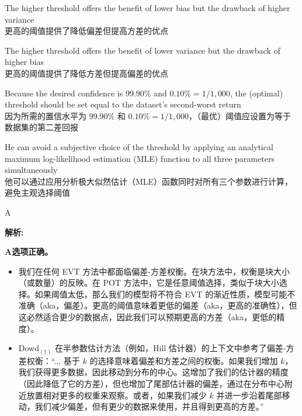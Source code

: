 \documentclass{article}
\newenvironment{explanation}
{\textbf{解析:}\par}
{\par}
\begin{document}
\begin{choices}
    \item The higher threshold offers the benefit of lower bias but the drawback of higher variance\\
    更高的阈值提供了降低偏差但提高方差的优点
    \item The higher threshold offers the benefit of lower variance but the drawback of higher bias\\
    更高的阈值提供了降低方差但提高偏差的优点
    \item Because the desired confidence is $99.90\%$ and $0.10\% = 1/1,000$, the (optimal) threshold should be set equal to the dataset’s second-worst return\\
    因为所需的置信水平为 $99.90\%$ 和 $0.10\% = 1/1,000$，（最优）阈值应设置为等于数据集的第二差回报
    \item He can avoid a subjective choice of the threshold by applying an analytical maximum log-likelihood estimation (MLE) function to all three parameters simultaneously\\
    他可以通过应用分析极大似然估计（MLE）函数同时对所有三个参数进行计算，避免主观选择阈值
\end{choices}

\begin{correctanswer}
    A
\end{correctanswer}

\begin{explanation}
    \textbf{A选项正确。} 
    \begin{itemize}
        \item 我们在任何 EVT 方法中都面临偏差-方差权衡。在块方法中，权衡是块大小（或数量）的反映。在 POT 方法中，它是任意阈值选择，类似于块大小选择。如果阈值太低，那么我们的模型将不符合 EVT 的渐近性质，模型可能不准确（aka，偏差）。更高的阈值意味着更低的偏差（aka，更高的准确性），但这必然适合更少的数据点，因此我们可以预期更高的方差（aka，更低的精度）。
   
        \item Dowd$_{(\dagger)}$ 在半参数估计方法（例如，Hill 估计器）的上下文中参考了偏差-方差权衡：“... 基于 $k$ 的选择意味着偏差和方差之间的权衡。如果我们增加 $k$，我们获得更多数据，因此移动到分布的中心。这增加了我们的估计器的精度（因此降低了它的方差），但也增加了尾部估计器的偏差，通过在分布中心附近放置相对更多的权重来观察。或者，如果我们减少 $k$ 并进一步沿着尾部移动，我们减少偏差，但有更少的数据来使用，并且得到更高的方差。”
    \end{itemize}
\end{explanation}
\end{document}
